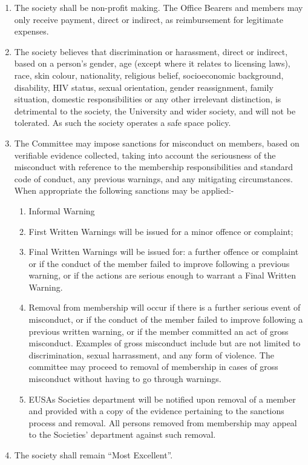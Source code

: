 \begin{enumerate}
  \item The society shall be non-profit making. The Office Bearers and members may only receive payment, direct or indirect, as reimbursement for legitimate expenses.

  \item The society believes that discrimination or harassment, direct or indirect,
    based on a person’s gender, age (except where it relates to licensing
    laws), race, skin colour, nationality, religious belief, socioeconomic background,
    disability, HIV status, sexual orientation, gender reassignment,
    family situation, domestic responsibilities or any other irrelevant distinction,
    is detrimental to the society, the University and wider society, and
    will not be tolerated. As such the society operates a safe space policy.

  \item The Committee may impose sanctions for misconduct on members,
    based on verifiable evidence collected, taking into account the seriousness of the misconduct
    with reference to the membership responsibilities and standard code of conduct, any previous warnings,
    and any mitigating circumstances. When appropriate the following sanctions may be applied:-

    \begin{enumerate}
      \item Informal Warning
      \item First Written Warnings will be issued for a minor offence or complaint;
      \item Final Written Warnings will be issued for: a further offence or complaint or if the conduct of the member
        failed to improve following a previous warning, or if the actions are serious enough to warrant a
        Final Written Warning.
      \item Removal from membership will occur if there is a further serious event of misconduct, or if the conduct
        of the member failed to improve following a previous written warning, or if the member committed
        an act of gross misconduct. Examples of gross misconduct include but are not limited to discrimination, sexual
        harrassment, and any form of violence. The committee may proceed to removal of membership in cases of gross
        misconduct without having to go through warnings.
      \item EUSA\textquotesingle s Societies department will be notified upon removal of a member and provided with a copy of
        the evidence pertaining to the sanctions process and removal. All persons removed from membership
        may appeal to the Societies' department against such removal.
    \end{enumerate}

  \item The society shall remain ``Most Excellent''.

\end{enumerate}
